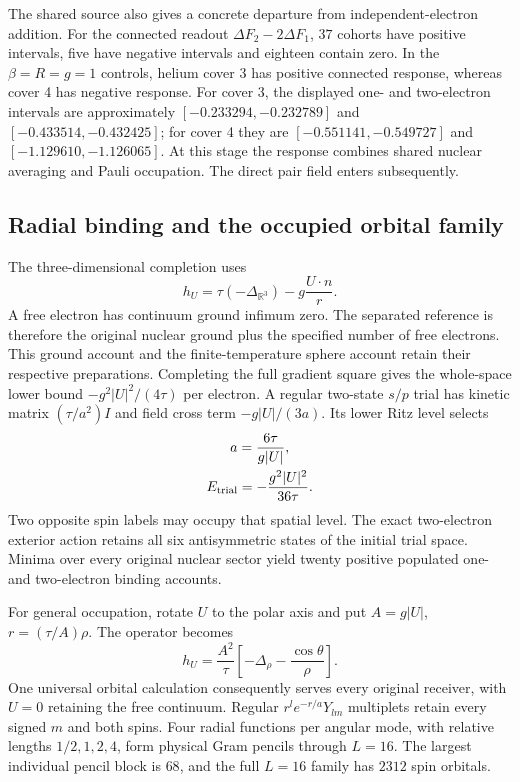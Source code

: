 The shared source also gives a concrete departure from independent-electron addition. For the connected readout $\Delta F_2-2\Delta F_1$, $37$ cohorts have positive intervals, five have negative intervals and eighteen contain zero. In the $\beta=R=g=1$ controls, helium cover 3 has positive connected response, whereas cover 4 has negative response. For cover 3, the displayed one- and two-electron intervals are approximately $[-0.233294,-0.232789]$ and $[-0.433514,-0.432425]$; for cover 4 they are $[-0.551141,-0.549727]$ and $[-1.129610,-1.126065]$. At this stage the response combines shared nuclear averaging and Pauli occupation. The direct pair field enters subsequently.

\subsection{Radial binding and the occupied orbital family}

The three-dimensional completion uses
\[
 h_U=\tau(-\Delta_{\mathbb R^3})-g\frac{U\cdot n}{r}.
\]
A free electron has continuum ground infimum zero. The separated reference is therefore the original nuclear ground plus the specified number of free electrons. This ground account and the finite-temperature sphere account retain their respective preparations. Completing the full gradient square gives the whole-space lower bound $-g^2|U|^2/(4\tau)$ per electron. A regular two-state $s/p$ trial has kinetic matrix $(\tau/a^2)I$ and field cross term $-g|U|/(3a)$. Its lower Ritz level selects
\[
\begin{gathered}
a=\frac{6\tau}{g|U|},\\
 E_{\rm trial}=-\frac{g^2|U|^2}{36\tau}.
\end{gathered}
\]
Two opposite spin labels may occupy that spatial level. The exact two-electron exterior action retains all six antisymmetric states of the initial trial space. Minima over every original nuclear sector yield twenty positive populated one- and two-electron binding accounts. 

For general occupation, rotate $U$ to the polar axis and put $A=g|U|$, $r=(\tau/A)\rho$. The operator becomes
\[
 h_U=\frac{A^2}{\tau}\left[-\Delta_\rho-\frac{\cos\theta}{\rho}\right].
\]
One universal orbital calculation consequently serves every original receiver, with $U=0$ retaining the free continuum. Regular $r^l e^{-r/a}Y_{lm}$ multiplets retain every signed $m$ and both spins. Four radial functions per angular mode, with relative lengths $1/2,1,2,4$, form physical Gram pencils through $L=16$. The largest individual pencil block is $68$, and the full $L=16$ family has $2312$ spin orbitals. 


